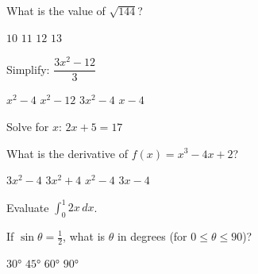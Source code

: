 \documentclass{article}
\begin{document}
\begin{question}
  What is the value of $\sqrt{144}$?
  \begin{choices}
    \choice $10$
    \choice $11$
    \choice $12$
    \choice $13$
  \end{choices}
\end{question}

\begin{question}
  Simplify: $\dfrac{3x^2 - 12}{3}$
  \begin{choices}
    \choice $x^2 - 4$
    \choice $x^2 - 12$
    \choice $3x^2 - 4$
    \choice $x - 4$
  \end{choices}
\end{question}

\begin{problem}
  Solve for $x$: $2x + 5 = 17$
\end{problem}

\begin{exercise}
  What is the derivative of $f(x) = x^3 - 4x + 2$?
  \begin{choices}
    \choice $3x^2 - 4$
    \choice $3x^2 + 4$
    \choice $x^2 - 4$
    \choice $3x - 4$
  \end{choices}
\end{exercise}

\begin{question}
  Evaluate $\displaystyle\int_0^1 2x\,dx$.
\end{question}

\begin{question}
  If $\sin\theta = \frac{1}{2}$, what is $\theta$ in degrees (for $0 \le \theta \le 90$)?
  \begin{choices}
    \choice $30°$
    \choice $45°$
    \choice $60°$
    \choice $90°$
  \end{choices}
\end{question}
\end{document}
